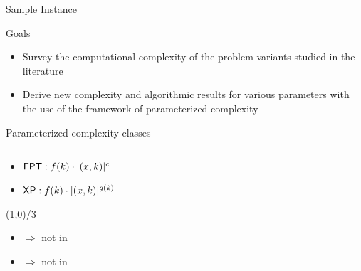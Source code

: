 \begin{frame}{Sample Instance}
    
\end{frame}

\begin{frame}{Goals}
    \begin{itemize}
        \item Survey the computational complexity of the problem variants studied in the literature
        \item Derive new complexity and algorithmic results for various parameters
        with the use of the framework of parameterized complexity
    \end{itemize}
\end{frame}

\begin{frame}{Parameterized complexity classes}
    \begin{columns}
        \begin{column}{0.39\textwidth}
            \begin{itemize}
                \item $\textsf{FPT}: f(k) \cdot |(x,k)|^c$
                \item $\textsf{XP}: f(k) \cdot |(x,k)|^{g(k)}$
            \end{itemize}

            \begin{center}
                \line(1,0){\textwidth/3}
            \end{center}

            \begin{itemize}
                \item \Wh $\Rightarrow$ not in \FPT
                \item \pNPh $\Rightarrow$ not in \XP
            \end{itemize}
        \end{column}
    
        \begin{column}{0.69\textwidth}
              
        \end{column}
      \end{columns}
\end{frame}
